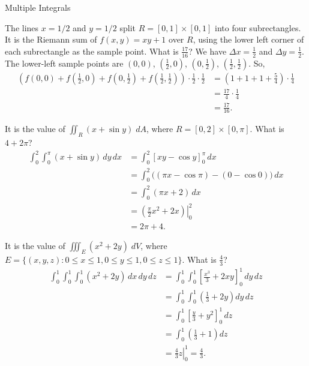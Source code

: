 \documentclass{article}
\begin{document}
\begin{category}{Multiple Integrals}

  \begin{clue}[say]
    The lines $x=1/2$ and $y=1/2$ split $R = [0,1] \times [0,1]$ into four subrectangles. It is the Riemann sum of $f(x,y) = xy+1$ over $R$, using the lower left corner of each subrectangle as the sample point.
  \response
    What is $\frac{17}{16}$?
  \solution
    We have $\Delta x=\frac{1}{2}$ and $\Delta y=\frac{1}{2}$. The lower-left sample points are
    $(0,0)$, $(\frac{1}{2},0)$, $(0,\frac{1}{2})$, $(\frac{1}{2},\frac{1}{2})$. So,
    \begin{align*}
    \left(f(0,0)+f\!\left(\tfrac{1}{2},0\right)+f\!\left(0,\tfrac{1}{2}\right)+f\!\left(\tfrac{1}{2},\tfrac{1}{2}\right)\right)\cdot\tfrac{1}{2}\cdot\tfrac{1}{2}
    &=\left(1+1+1+\tfrac{5}{4}\right)\cdot\tfrac{1}{4} \\
    &=\frac{17}{4}\cdot\frac{1}{4}\\
    &=\frac{17}{16}.
    \end{align*}
  \end{clue}

  \begin{clue}[say]
    It is the value of $\displaystyle \iint_R (x + \sin y) \; dA$, where $R = [0,2] \times [0, \pi]$.
  \response
    What is $4+2\pi$?
  \solution
    \begin{align*}
    \int_0^2\int_0^{\pi}(x+\sin y)\,dy\,dx
    &=\int_0^2\left[xy-\cos y\right]_0^{\pi}\,dx \\
    &=\int_0^2\bigl((\pi x-\cos\pi)-(0-\cos 0)\bigr)\,dx \\
    &=\int_0^2(\pi x+2)\,dx \\
    &=\left.\left(\frac{\pi}{2}x^2+2x\right)\right|_0^2 \\
    &=2\pi+4.
    \end{align*}
  \end{clue}

  \begin{clue}[say]
    It is the value of $\displaystyle \iiint_E (x^2 + 2y) \; dV$, where $E = \{(x,y,z) \colon 0 \leq x \leq 1, 0 \leq y \leq 1, 0 \leq z \leq 1\}.$
  \response
    What is $\frac{4}{3}$?
  \solution
    \begin{align*}
    \int_0^1\int_0^1\int_0^1(x^2+2y)\,dx\,dy\,dz
    &=\int_0^1\int_0^1\left[\frac{x^3}{3}+2xy\right]_0^1\,dy\,dz \\
    &=\int_0^1\int_0^1\left(\frac{1}{3}+2y\right)dy\,dz \\
    &=\int_0^1\left[\frac{y}{3}+y^2\right]_0^1\,dz \\
    &=\int_0^1\left(\frac{1}{3}+1\right)dz \\
    &=\left.\frac{4}{3}z\right|_0^1=\frac{4}{3}.
    \end{align*}
  \end{clue}


\end{category}
\end{document}
